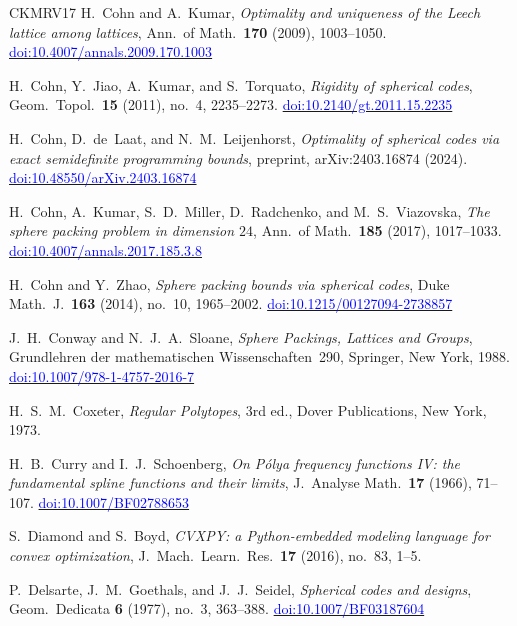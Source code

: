 \documentclass[11pt,reqno]{amsart}
\newcommand{\bluelink}[2]{\href{#1}{\textcolor{blue}{#2}}}
\renewcommand{\_}{\origunderscore\allowbreak}
\numberwithin{equation}{section}
\theoremstyle{plain}
\theoremstyle{definition}
\theoremstyle{remark}
\begin{document}
\begin{thebibliography}{CKMRV17}
H.~Cohn and A.~Kumar,
\textit{Optimality and uniqueness of the {L}eech lattice among lattices},
Ann.\ of Math.\ \textbf{170} (2009), 1003--1050.
\bluelink{https://doi.org/10.4007/annals.2009.170.1003}{doi:10.4007/annals.2009.170.1003}

H.~Cohn, Y.~Jiao, A.~Kumar, and S.~Torquato,
\textit{Rigidity of spherical codes},
Geom.\ Topol.\ \textbf{15} (2011), no.~4, 2235--2273.
\bluelink{https://doi.org/10.2140/gt.2011.15.2235}{doi:10.2140/gt.2011.15.2235}

H.~Cohn, D.~de~Laat, and N.~M.~Leijenhorst,
\textit{Optimality of spherical codes via exact semidefinite programming
bounds},
preprint, arXiv:2403.16874 (2024).
\bluelink{https://doi.org/10.48550/arXiv.2403.16874}{doi:10.48550/arXiv.2403.16874}

H.~Cohn, A.~Kumar, S.~D.~Miller, D.~Radchenko, and M.~S.~Viazovska,
\textit{The sphere packing problem in dimension $24$},
Ann.\ of Math.\ \textbf{185} (2017), 1017--1033.
\bluelink{https://doi.org/10.4007/annals.2017.185.3.8}{doi:10.4007/annals.2017.185.3.8}

H.~Cohn and Y.~Zhao,
\textit{Sphere packing bounds via spherical codes},
Duke Math.\ J.\ \textbf{163} (2014), no.~10, 1965--2002.
\bluelink{https://doi.org/10.1215/00127094-2738857}{doi:10.1215/00127094-2738857}

J.~H.~Conway and N.~J.~A.~Sloane,
\textit{Sphere Packings, Lattices and Groups},
Grundlehren der mathematischen Wissenschaften~290,
Springer, New York, 1988.
\bluelink{https://doi.org/10.1007/978-1-4757-2016-7}{doi:10.1007/978-1-4757-2016-7}

H.~S.~M.~Coxeter,
\textit{Regular Polytopes}, 3rd ed.,
Dover Publications, New York, 1973.

H.~B.~Curry and I.~J.~Schoenberg,
\textit{On {P}\'olya frequency functions {IV}: the fundamental spline functions
and their limits},
J.\ Analyse Math.\ \textbf{17} (1966), 71--107.
\bluelink{https://doi.org/10.1007/BF02788653}{doi:10.1007/BF02788653}

S.~Diamond and S.~Boyd,
\textit{CVXPY: a Python-embedded modeling language for convex optimization},
J.\ Mach.\ Learn.\ Res.\ \textbf{17} (2016), no.~83, 1--5.

P.~Delsarte, J.~M.~Goethals, and J.~J.~Seidel,
\textit{Spherical codes and designs},
Geom.\ Dedicata \textbf{6} (1977), no.~3, 363--388.
\bluelink{https://doi.org/10.1007/BF03187604}{doi:10.1007/BF03187604}


\end{thebibliography}
\end{document}
